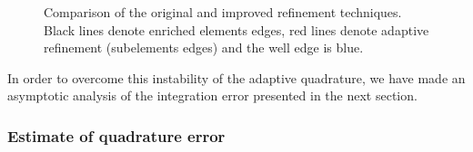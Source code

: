 \begin{figure}[!htb]
  \centering    
  \hspace{0pt}
  \caption[Adaptive refinement comparison]
  {Comparison of the original and improved refinement techniques.
   Black lines denote enriched elements edges, red lines denote adaptive refinement (subelements edges) and the well
   edge is blue.
  }
  \label{fig:adapt_refinement}
\end{figure}
In order to overcome this instability of the adaptive quadrature, we have made an asymptotic analysis of the integration error presented 
in the next section.

\subsubsection{Estimate of quadrature error}

